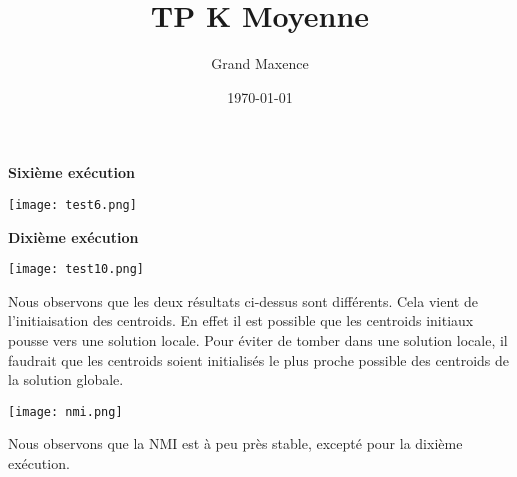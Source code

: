 \documentclass[a4paper,11pt]{scrartcl}
\title{TP K Moyenne}
\author{Grand Maxence}
\date{\today}
\begin{document}
\maketitle

\begin{center}
  \textbf{Sixi\`eme ex\'ecution}\par\medskip
\texttt{[image: test6.png]}
\end{center}
\begin{center}
  \textbf{Dixi\`eme ex\'ecution}\par\medskip
\texttt{[image: test10.png]}
\end{center}
Nous observons que les deux r\'esultats ci-dessus sont diff\'erents. Cela vient
de l'initiaisation des centroids. En effet il est possible que les centroids
initiaux pousse vers une solution locale. Pour \'eviter de tomber dans une solution
locale, il faudrait que les centroids soient initialis\'es le plus proche possible des
centroids de la solution globale.

\begin{center}
\texttt{[image: nmi.png]}
\end{center}

Nous observons que la NMI est \`a peu pr\`es stable, except\'e pour la dixi\`eme
ex\'ecution.
\end{document}
